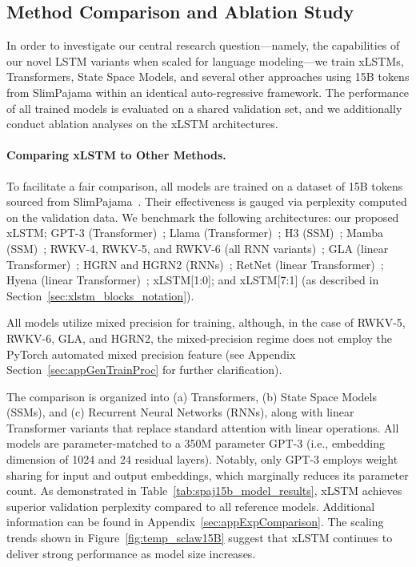 \subsection{Method Comparison and Ablation Study}
\label{sec:ExpComparison}

In order to investigate our central research question—namely, the capabilities of our novel LSTM variants when scaled for language modeling—we train xLSTMs, Transformers, State Space Models, and several other approaches using 15B tokens from SlimPajama within an identical auto-regressive framework. The performance of all trained models is evaluated on a shared validation set, and we additionally conduct ablation analyses on the xLSTM architectures.

\paragraph{Comparing xLSTM to Other Methods.} To facilitate a fair comparison, all models are trained on a dataset of 15B tokens sourced from SlimPajama~\citep{Soboleva:23}. Their effectiveness is gauged via perplexity computed on the validation data. We benchmark the following architectures: our proposed xLSTM; GPT-3 (Transformer)~\citep{Brown:20short}; Llama (Transformer)~\citep{Touvron:23arxiv}; H3 (SSM)~\citep{Fu:23}; Mamba (SSM)~\citep{Gu:24arxiv}; RWKV-4, RWKV-5, and RWKV-6 (all RNN variants)~\citep{Peng:23arxivshort, Peng:24arxivshort}; GLA (linear Transformer)~\citep{Yang:23arxiv}; HGRN and HGRN2 (RNNs)~\citep{Qin:23, Qin:24arxiv}; RetNet (linear Transformer)~\citep{Sun:23arxiv}; Hyena (linear Transformer)~\citep{Poli:23}; xLSTM[1:0]; and xLSTM[7:1] (as described in Section~\ref{sec:xlstm_blocks_notation}). 

All models utilize mixed precision for training, although, in the case of RWKV-5, RWKV-6, GLA, and HGRN2, the mixed-precision regime does not employ the PyTorch automated mixed precision feature (see Appendix Section~\ref{sec:appGenTrainProc} for further clarification). 

The comparison is organized into (a) Transformers, (b) State Space Models (SSMs), and (c) Recurrent Neural Networks (RNNs), along with linear Transformer variants that replace standard attention with linear operations. All models are parameter-matched to a 350M parameter GPT-3 (i.e., embedding dimension of 1024 and 24 residual layers). Notably, only GPT-3 employs weight sharing for input and output embeddings, which marginally reduces its parameter count. As demonstrated in Table~\ref{tab:spaj15b_model_results}, xLSTM achieves superior validation perplexity compared to all reference models. Additional information can be found in Appendix~\ref{sec:appExpComparison}. The scaling trends shown in Figure~\ref{fig:temp_sclaw15B} suggest that xLSTM continues to deliver strong performance as model size increases.

